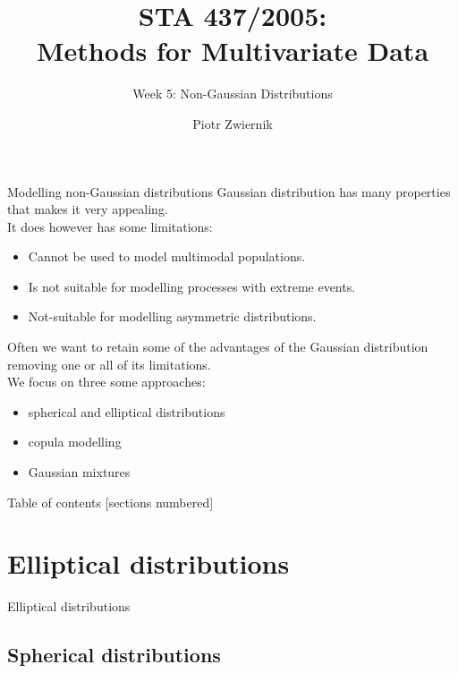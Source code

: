 \documentclass[11pt,handout,aspectratio=169]{beamer}
\title[STA437-Week1]{STA 437/2005: \\ Methods for Multivariate Data}
\subtitle[]{Week 5: Non-Gaussian Distributions}
\author[Piotr Zwiernik]{Piotr Zwiernik}
\institute[UofT]{University of Toronto}
\date{}
\begin{document}
\maketitle

\begin{frame}{Modelling non-Gaussian distributions}
	Gaussian distribution has many properties that makes it very appealing.\\[2mm]
	
	It does however has some limitations:
	\begin{itemize}
		\item Cannot be used to model multimodal populations.
		\item Is not suitable for modelling processes with extreme events. 
		\item Not-suitable for modelling asymmetric distributions. \\[3mm]
	\end{itemize}
	
	Often we want to retain some of the advantages of the Gaussian distribution removing one or all of its limitations.\\[3mm]
	We focus on three some approaches: 
	\begin{itemize}
		\item spherical and elliptical distributions
		\item copula modelling
		\item Gaussian mixtures
	\end{itemize}
\end{frame}


\begin{frame}{Table of contents}
[sections numbered]
\tableofcontents%
\end{frame}


\section{Elliptical distributions}

\begin{frame}{}
	\begin{center}
		{\Huge \alert{Elliptical distributions}}
	\end{center}
\end{frame}

\subsection{Spherical distributions}
\end{document}
